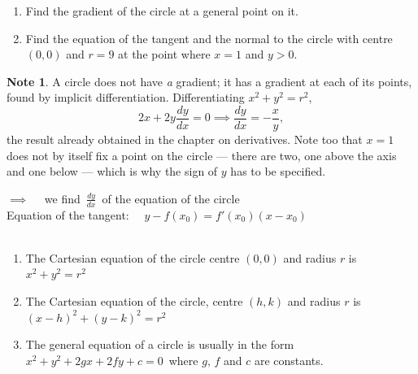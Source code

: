 \documentclass[11pt,a4paper]{article}
\theoremstyle{definition}
\newtheorem{note}[thm]{Note}
\begin{document}
\begin{enumerate}
\item Find the gradient of the circle at a general point on it.
\item Find the equation of the tangent and the normal to the circle with centre
$(0,0)$ and $r = 9$ at the point where $x = 1$ and $y>0$.
\end{enumerate}

\begin{note}
A circle does not have \emph{a} gradient; it has a gradient at each of its points,
found by implicit differentiation. Differentiating $x^{2}+y^{2}=r^{2}$,
$$2x+2y\frac{dy}{dx}=0 \implies \frac{dy}{dx}=-\frac{x}{y},$$
the result already obtained in the chapter on derivatives. Note too that $x=1$ does
not by itself fix a point on the circle --- there are two, one above the axis and
one below --- which is why the sign of $y$ has to be specified.
\end{note}



$\implies\quad  $ we find $\,\frac{dy}{dx}\,$ of the equation of the circle\\

Equation of the tangent: $\quad  y - f(x_0) = f'(x_0) \left( x - x_0\right)$\\\\



\begin{enumerate}
\item[$*$] The Cartesian equation of the circle centre $(0,0)$ and radius $r$ is \,$x^2 + y^2 = r^2$

\item The Cartesian equation of the circle, centre $(h,k)$ and radius $r$ is \,$(x - h)^2 + (y - k)^2 = r^2$

\item The general equation of a circle is usually in the form \,$x^2 + y^2 + 2gx + 2fy + c = 0$\, where $g, \, f$ and $c$ are constants.\\
\end{enumerate}
\end{document}
